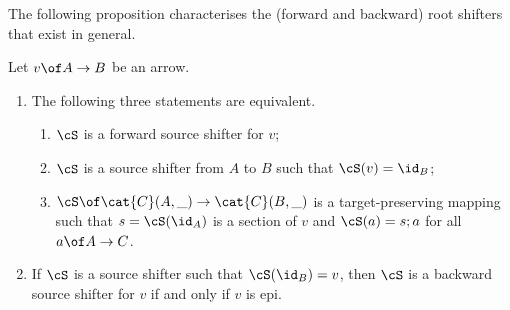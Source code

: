 The following proposition characterises the (forward and backward) root shifters that exist in general.
%
\begin{proposition}
Let $v\of A\to B$ be an arrow.
\begin{enumerate}[topsep=\smallskipamount]
\item The following three statements are equivalent.
\begin{enumerate}[label=(\alph*),ref=\theenumi(\theenumii)]
\item\label{forward-1} $\cS$ is a forward source shifter for $v$;
\item\label{forward-2} $\cS$ is a source shifter from $A$ to $B$ such that $\cS(v)=\id_B$;
\item\label{forward-3} $\cS \of \cat{C}(A,\_) \to \cat{C}(B, \_)$ is a target-preserving mapping such that $s=\cS(\id_A)$ is a section of $v$ and $\cS(a)=s;a$ for all $a\of A\to C$.
\end{enumerate}
\item If $\cS$ is a source shifter such that $\cS(\id_B)=v$, then $\cS$ is a backward source shifter for $v$ if and only if $v$ is epi.
\end{enumerate}
\end{proposition}
%

